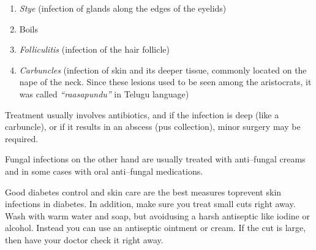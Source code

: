 \begin{enumerate}[•]
\itemsep=0pt
\item \textit{Stye} (infection of glands along the edges of the eyelids)
\item Boils
\item \textit{Folliculitis} (infection of the hair follicle)
\item \textit{Carbuncles} (infection of skin and its deeper tissue, commonly located on the nape of the neck. Since these lesions used to be seen among the aristocrats, it was called \textit{“raasapundu”} in Telugu language)
\end{enumerate}

Treatment usually involves antibiotics, and if the infection is deep (like a carbuncle), or if it results in an abscess (pus collection), minor surgery may be required.

Fungal infections on the other hand are usually treated with anti–fungal creams and in some cases with oral anti–fungal medications.

Good diabetes control and skin care are the best measures to\break prevent skin infections in diabetes. In addition, make sure you treat small cuts right away. Wash with warm water and soap, but avoid\break using a harsh antiseptic like iodine or alcohol. Instead you can use an antiseptic ointment or cream. If the cut is large, then have your doctor check it right away.

